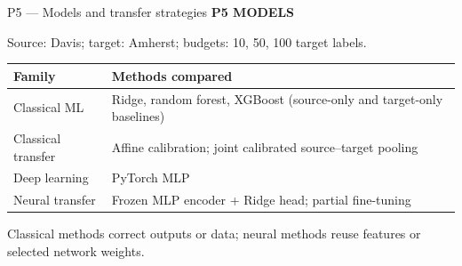 \documentclass[aspectratio=169,11pt]{beamer}
\newcommand{\sectiontag}[1]{{\footnotesize\usebeamercolor[fg]{structure}\textbf{#1}}\par\vspace{0.10cm}}
\newcommand{\smallmuted}[1]{{\footnotesize\color{slate}#1\par}}
\begin{document}
\begin{frame}{P5 — Models and transfer strategies}
\sectiontag{P5 \quad MODELS}
\smallmuted{Source: Davis; target: Amherst; budgets: 10, 50, 100 target labels.}\vspace{0.20cm}
\renewcommand{\arraystretch}{1.30}
{\small
\begin{tabularx}{\linewidth}{@{}P{2.42cm}Y@{}}\toprule
\textbf{Family} & \textbf{Methods compared}\\\midrule
{} Classical ML & Ridge, random forest, XGBoost (source-only and target-only baselines)\\
 Classical transfer & Affine calibration; joint calibrated source--target pooling\\
 Deep learning & PyTorch MLP\\
 Neural transfer & Frozen MLP encoder + Ridge head; partial fine-tuning\\\bottomrule
\end{tabularx}\par}
\vspace{0.15cm}
\smallmuted{Classical methods correct outputs or data; neural methods reuse features or selected network weights.}
\end{frame}
\end{document}
